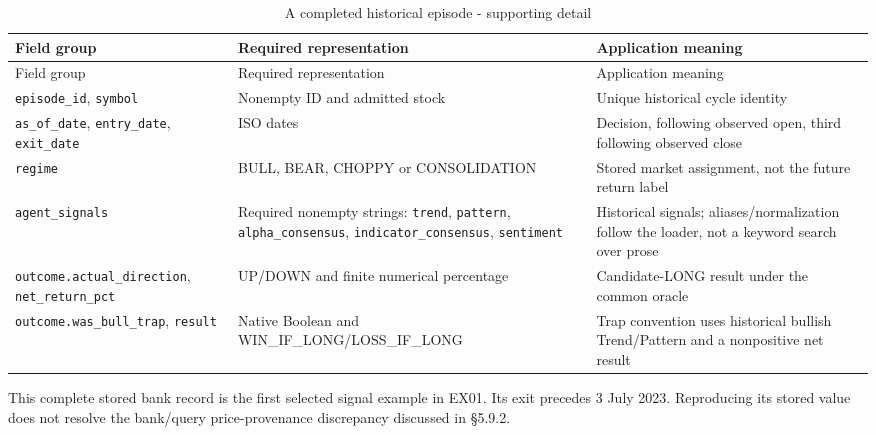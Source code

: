 \begingroup
\small
{}
\setlength{\tabcolsep}{3pt}

\begin{longtable}[]{@{}
  >{\raggedright\arraybackslash}p{}
  >{\raggedright\arraybackslash}p{}
  >{\raggedright\arraybackslash}p{}@{}}
\caption{A completed historical episode - supporting detail}\label{tab:A_contracts:2}\tabularnewline
\toprule\noalign{}
Field group
 & Required representation
 & Application meaning
 \\
\midrule\noalign{}
\endfirsthead
\toprule\noalign{}
Field group
 & Required representation
 & Application meaning
 \\
\midrule\noalign{}
\endhead
\bottomrule\noalign{}
\endlastfoot
\texttt{episode\_\allowbreak{}id}, \texttt{symbol} & Nonempty ID and admitted stock & Unique historical cycle identity \\
\texttt{as\_\allowbreak{}of\_\allowbreak{}date}, \texttt{entry\_\allowbreak{}date}, \texttt{exit\_\allowbreak{}date} & ISO dates & Decision, following observed open, third following observed close \\
\texttt{regime} & BULL, BEAR, CHOPPY or CONSOLIDATION & Stored market assignment, not the future return label \\
\texttt{agent\_\allowbreak{}signals} & Required nonempty strings: \texttt{trend}, \texttt{pattern}, \texttt{alpha\_\allowbreak{}consensus}, \texttt{indicator\_\allowbreak{}consensus}, \texttt{sentiment} & Historical signals; aliases/normalization follow the loader, not a keyword search over prose \\
\texttt{outcome.\allowbreak{}actual\_\allowbreak{}direction}, \texttt{net\_\allowbreak{}return\_\allowbreak{}pct} & UP/\allowbreak{}DOWN and finite numerical percentage & Candidate-LONG result under the common oracle \\
\texttt{outcome.\allowbreak{}was\_\allowbreak{}bull\_\allowbreak{}trap}, \texttt{result} & Native Boolean and WIN\_\allowbreak{}IF\_\allowbreak{}LONG/LOSS\_\allowbreak{}IF\_\allowbreak{}LONG & Trap convention uses historical bullish Trend/Pattern and a nonpositive net result \\
\end{longtable}

\endgroup

This complete stored bank record is the first selected signal example in
EX01. Its exit precedes 3 July 2023. Reproducing its stored value does not
resolve the bank/query price-provenance discrepancy discussed in §5.9.2.


